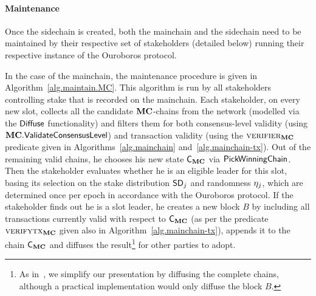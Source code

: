 


\paragraph{Maintenance}

Once the sidechain is created, both the mainchain and the sidechain need to be
maintained by their respective set of stakeholders (detailed below) running
their respective instance of the Ouroboros protocol.

In the case of the mainchain, the maintenance procedure is given
in Algorithm~\ref{alg.maintain.MC}.
This algorithm is run by all stakeholders controlling stake that is recorded on
the mainchain. Each stakeholder, on every new slot, collects all the candidate
$\mathbf{MC}$-chains from the network (modelled via the $\mathsf{Diffuse}$ functionality) and
filters them for both consensus-level validity (using $\mathbf{MC}.\mathsf{ValidateConsensusLevel}$) and
transaction validity (using the $\textsc{verifier}_{\mathbf{MC}}$ predicate given in
Algorithms~\ref{alg.mainchain} and~\ref{alg.mainchain-tx}). Out of the remaining valid chains, he chooses
his new state $\mathsf{C}_{\mathbf{MC}}$ via $\mathsf{PickWinningChain}$. Then the stakeholder
evaluates whether he is an eligible leader for this slot, basing its selection
on the stake distribution $\mathsf{SD}_j$ and randomness $\eta_j$, which are determined
once per epoch
in accordance with the Ouroboros protocol.
If the stakeholder finds out he is a slot leader, he creates a new block $B$ by
including all transactions currently valid with respect to $\mathsf{C}_{\mathbf{MC}}$
(as per the predicate $\textsc{verifytx}_{\mathbf{MC}}$ given also in Algorithm~\ref{alg.mainchain-tx}),
appends it to the chain $\mathsf{C}_{\mathbf{MC}}$ and diffuses the result\footnote{
As in~\cite{ouroboros,praos}, we simplify our
presentation by diffusing the complete chains,
although a practical implementation would only diffuse the block $B$.}
for other parties to adopt.

